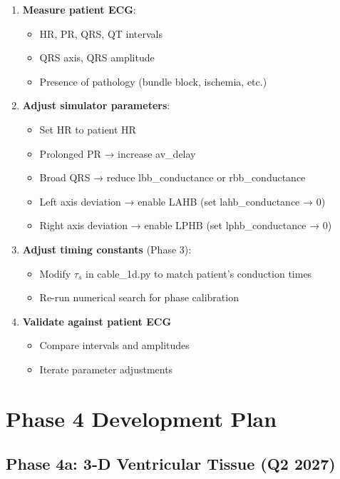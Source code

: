 \documentclass[11pt, a4paper]{article}
\begin{document}
\begin{enumerate}
    \item \textbf{Measure patient ECG}:
    \begin{itemize}
        \item HR, PR, QRS, QT intervals
        \item QRS axis, QRS amplitude
        \item Presence of pathology (bundle block, ischemia, etc.)
    \end{itemize}
    
    \item \textbf{Adjust simulator parameters}:
    \begin{itemize}
        \item Set HR to patient HR
        \item Prolonged PR → increase av\_delay
        \item Broad QRS → reduce lbb\_conductance or rbb\_conductance
        \item Left axis deviation → enable LAHB (set lahb\_conductance → 0)
        \item Right axis deviation → enable LPHB (set lphb\_conductance → 0)
    \end{itemize}
    
    \item \textbf{Adjust timing constants} (Phase 3):
    \begin{itemize}
        \item Modify $\tau_s$ in cable\_1d.py to match patient's conduction times
        \item Re-run numerical search for phase calibration
    \end{itemize}
    
    \item \textbf{Validate against patient ECG}
    \begin{itemize}
        \item Compare intervals and amplitudes
        \item Iterate parameter adjustments
    \end{itemize}
\end{enumerate}

\section{Phase 4 Development Plan}

\subsection{Phase 4a: 3-D Ventricular Tissue (Q2 2027)}
\end{document}

